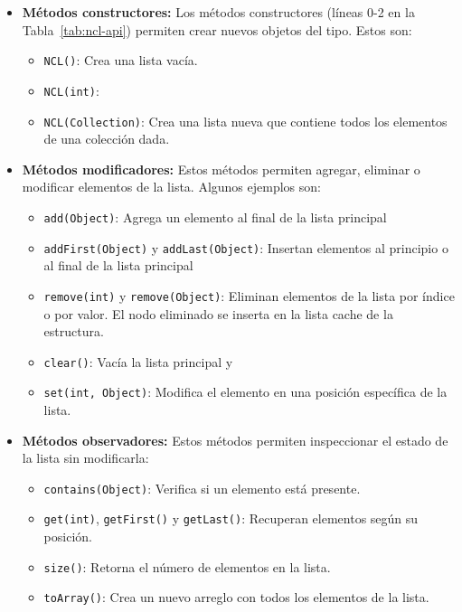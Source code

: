 \begin{itemize}
    \item \textbf{Métodos constructores:}
    Los métodos constructores (líneas 0-2 en la Tabla~\ref{tab:ncl-api}) permiten crear nuevos objetos del tipo. Estos son:
    \begin{itemize}
        \item \texttt{NCL()}: Crea una lista vacía.
        \item \texttt{NCL(int)}: 
        \item \texttt{NCL(Collection)}: Crea una lista nueva que contiene todos los elementos de una colección dada.
    \end{itemize}
    \item \textbf{Métodos modificadores:}
    Estos métodos permiten agregar, eliminar o modificar elementos de la lista. Algunos ejemplos son:
    \begin{itemize}
        \item \texttt{add(Object)}: Agrega un elemento al final de la lista principal 
        \item \texttt{addFirst(Object)} y \texttt{addLast(Object)}: Insertan elementos al principio o al final de la lista principal 
        \item \texttt{remove(int)} y \texttt{remove(Object)}: Eliminan elementos de la lista por índice o por valor. El nodo eliminado se inserta en la lista cache de la estructura.
        \item \texttt{clear()}: Vacía la lista principal y  
        \item \texttt{set(int, Object)}: Modifica el elemento en una posición específica de la lista.
    \end{itemize}
    \item \textbf{Métodos observadores:}  
    Estos métodos permiten inspeccionar el estado de la lista sin modificarla:
    \begin{itemize}
        \item \texttt{contains(Object)}: Verifica si un elemento está presente.
        \item \texttt{get(int)}, \texttt{getFirst()} y \texttt{getLast()}: Recuperan elementos según su posición.
        \item \texttt{size()}: Retorna el número de elementos en la lista.
        \item \texttt{toArray()}: Crea un nuevo arreglo con todos los elementos de la lista.
    \end{itemize}
\end{itemize}

